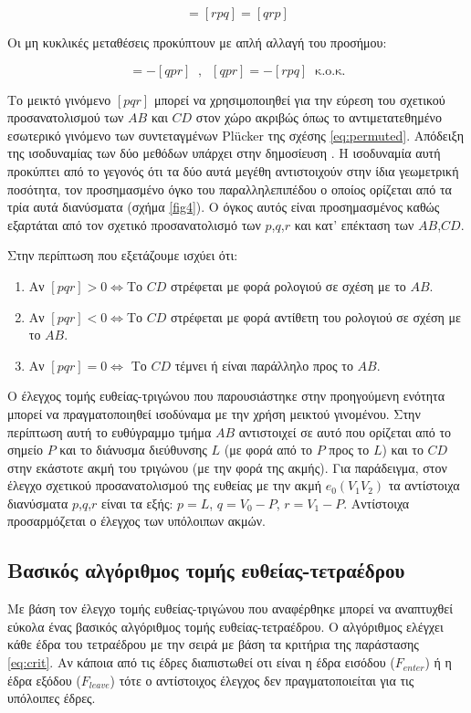 \begin{equation}
[p q r] = [r p q] = [q r p]
 \label{eq:circular}
\end{equation}

Οι μη κυκλικές μεταθέσεις προκύπτουν με απλή αλλαγή του προσήμου:

\begin{equation}
[p q r] = -[q p r]\;\;,\;\;[q p r] = -[r p q] \;\;\text{κ.ο.κ.}
\label{eq:noncircular}
\end{equation}

Το μεικτό γινόμενο $[p q r]$ μπορεί να χρησιμοποιηθεί για την εύρεση του σχετικού προσανατολισμού των $AB$ και $CD$ στον χώρο ακριβώς όπως το αντιμετατεθημένο εσωτερικό γινόμενο των συντεταγμένων Plücker της σχέσης \eqref{eq:permuted}. Απόδειξη της ισοδυναμίας των δύο μεθόδων υπάρχει στην δημοσίευση \cite{kensler:06:triangle}. Η ισοδυναμία αυτή προκύπτει από το γεγονός ότι τα δύο αυτά μεγέθη αντιστοιχούν στην ίδια γεωμετρική ποσότητα, τον προσημασμένο όγκο του παραλληλεπιπέδου ο οποίος ορίζεται από τα τρία αυτά διανύσματα (σχήμα \ref{fig4}). Ο όγκος αυτός είναι προσημασμένος καθώς εξαρτάται από τον σχετικό προσανατολισμό των $p$,$q$,$r$ και κατ' επέκταση των $AB$,$CD$.

Στην περίπτωση που εξετάζουμε ισχύει ότι:

\begin{enumerate}
\item
 Αν $[p q r] > 0\iff$Το $CD$ στρέφεται με φορά ρολογιού σε σχέση με το $AB$.
\item
Αν $[p q r] < 0\iff$Το $CD$ στρέφεται με φορά αντίθετη του ρολογιού σε σχέση με το $AB$.
\item
Αν $[p q r] = 0\iff$ Το $CD$ τέμνει ή είναι παράλληλο προς το $AB$.\\
\end{enumerate}
Ο έλεγχος τομής ευθείας-τριγώνου που παρουσιάστηκε στην προηγούμενη ενότητα μπορεί να πραγματοποιηθεί ισοδύναμα με την χρήση μεικτού γινομένου. Στην περίπτωση αυτή το ευθύγραμμο τμήμα $AB$ αντιστοιχεί σε αυτό που ορίζεται από το σημείο $P$ και το διάνυσμα διεύθυνσης $L$ (με φορά από το $P$ προς το $L$) και το $CD$ στην εκάστοτε ακμή του τριγώνου (με την φορά της ακμής). Για παράδειγμα, στον έλεγχο σχετικού προσανατολισμού της ευθείας με την ακμή $e_0(V_1V_2)$  τα αντίστοιχα διανύσματα $p$,$q$,$r$ είναι τα εξής: $p=L$, $q=V_0-P$, $ r=V_1-P$. Αντίστοιχα προσαρμόζεται ο έλεγχος των υπόλοιπων ακμών.

\subsection{Βασικός αλγόριθμος τομής ευθείας-τετραέδρου}
\label{chapter:raytetraint}
\noindent  Με βάση τον έλεγχο τομής ευθείας-τριγώνου που αναφέρθηκε μπορεί να αναπτυχθεί εύκολα ένας βασικός αλγόριθμος τομής ευθείας-τετραέδρου. Ο αλγόριθμος ελέγχει κάθε έδρα του τετραέδρου με την σειρά με βάση τα κριτήρια της παράστασης \eqref{eq:crit}. Aν κάποια από τις έδρες διαπιστωθεί οτι είναι η έδρα εισόδου ($F_{enter}$) ή η έδρα εξόδου ($F_{leave}$) τότε ο αντίστοιχος έλεγχος δεν πραγματοποιείται για τις υπόλοιπες έδρες. 

